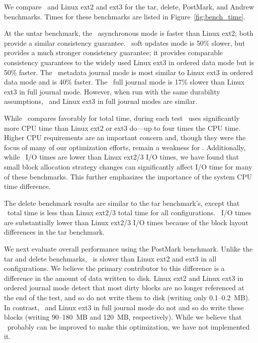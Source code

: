 We compare \Kudos\ and Linux ext2 and ext3 for the tar, delete,
PostMark, and Andrew benchmarks. Times for these benchmarks are listed
in Figure~\ref{fig:bench_time}.

\benchtable{}

At the untar benchmark, the \Kudos\ asynchronous mode is faster than
Linux ext2; both provide a similar consistency guarantee.
%
\Kudos\ soft updates mode is 50\% slower, but provides a much stronger
consistency guarantee; it provides comparable consistency guarantees
to the widely used Linux ext3 in ordered data mode but is 50\% faster.
%
The \Kudos\ metadata journal mode is most similar to Linux ext3 in
ordered data mode and is 40\% faster.
%
The \Kudos\ full journal mode is 17\% slower than Linux ext3 in full
journal mode.
%
However, when run with the same durability assumptions, \Kudos\ and
Linux ext3 in full journal modes are similar.

While \Kudos\ compares favorably for total time, during each test
\Kudos\ uses significantly more CPU time than Linux ext2 or ext3
do---up to four times the CPU time.
%
Higher CPU requirements are an important concern and, though they were
the focus of many of our optimization efforts, remain a weakness
for \Kudos.
%
Additionally, while \Kudos\ I/O times are lower than Linux ext2/3 I/O
times, we have found that small block allocation strategy changes can
significantly affect I/O time for many of these benchmarks. This further
emphasizes the importance of the system CPU time difference.


The delete benchmark results are similar to the tar benchmark's,
except that \Kudos\ total time is less than Linux ext2/3 total time
for all configurations. \Kudos\ I/O times are substantially lower
than Linux ext2/3 I/O times because of the block layout differences in
the tar benchmark.

We next evaluate overall performance using the PostMark benchmark.
Unlike the tar and delete benchmarks, \Kudos\ is slower than Linux
ext2 and ext3 in all configurations.
%
We believe the primary contributor to this difference is a difference
in the amount of data written to disk. Linux ext2 and Linux ext3 in
ordered journal mode detect that most dirty blocks are no longer
referenced at the end of the test, and so do not write them to disk
(writing only 0.1--0.2~MB). In contrast, \Kudos\ and Linux ext3 in
full journal mode do not and so do write these blocks (writing
90--180~MB and 120~MB, respectively).
%
While we believe that \Kudos\ probably can be improved to make this
optimization, we have not implemented it.
%

